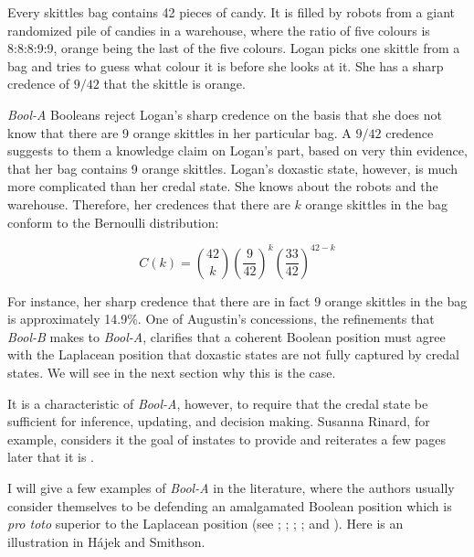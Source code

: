 \documentclass[11pt]{article}
\newcommand{\anderson}[0]{\textit{Bool-A}}
\newcommand{\augustin}[0]{\textit{Bool-B}}
\begin{document}
\begin{quotex}
  \label{ex:skittles} Every skittles bag contains
  42 pieces of candy. It is filled by robots from a giant randomized
  pile of candies in a warehouse, where the ratio of five colours is
  8:8:8:9:9, orange being the last of the five colours. Logan picks
  one skittle from a bag and tries to guess what colour it is before
  she looks at it. She has a sharp credence of $9/42$ that the skittle
  is orange.
\end{quotex}

{\anderson} Booleans reject Logan's sharp credence on the basis
that she does not know that there are 9 orange skittles in her
particular bag. A $9/42$ credence suggests to them a knowledge claim
on Logan's part, based on very thin evidence, that her bag contains 9
orange skittles. Logan's doxastic state, however, is much more
complicated than her credal state. She knows about the robots and the
warehouse. Therefore, her credences that there are $k$ orange skittles
in the bag conform to the Bernoulli distribution:

\begin{equation}
  \label{eq:bern}
  C(k)=\binom{42}{k}\left(\frac{9}{42}\right)^{k}\left(\frac{33}{42}\right)^{42-k}
\end{equation}

For instance, her sharp credence that there are in fact $9$ orange
skittles in the bag is approximately 14.9\%. One of Augustin's
concessions, the refinements that {\augustin} makes to {\anderson},
clarifies that a coherent Boolean position must agree with the
Laplacean position that doxastic states are not fully captured by
credal states. We will see in the next section why this is the case.

It is a characteristic of {\anderson}, however, to require that
the credal state be sufficient for inference, updating, and decision
making. Susanna Rinard, for example, considers it the goal of instates
to provide   and reiterates a few pages later
that it is 
.

I will give a few examples of {\anderson} in the literature, where the
authors usually consider themselves to be defending an amalgamated
Boolean position which is \emph{pro toto} superior to the Laplacean
position (see ; ;
; ; and
). Here is an illustration in H{\'a}jek and
Smithson.
\end{document}
